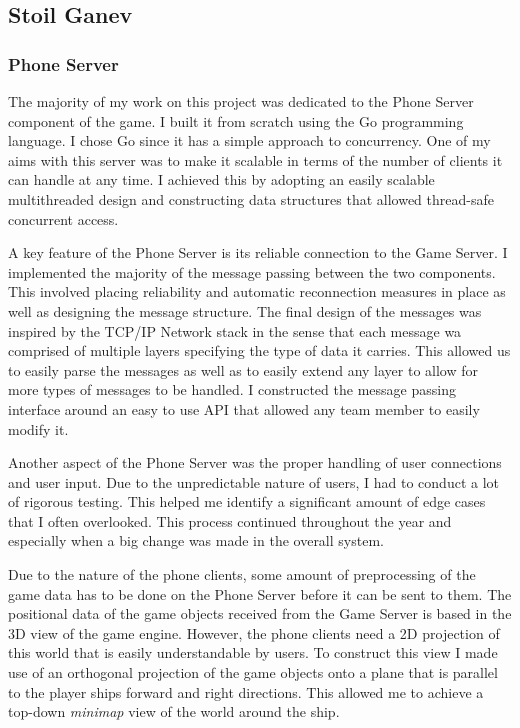 \documentclass[a4paper,11pt]{article}
\begin{document}
\clearpage

\subsection{Stoil Ganev}

\subsubsection{Phone Server}

The majority of my work on this project was dedicated to the Phone Server component of the game. I built it from scratch using the Go programming language. I chose Go since it has a simple approach to concurrency. One of my aims with this server was to make it scalable in terms of the number of clients it can handle at any time. I achieved this by adopting an easily scalable multithreaded design and constructing data structures that allowed thread-safe concurrent access.

A key feature of the Phone Server is its reliable connection to the Game Server. I implemented the majority of the message passing between the two components. This involved placing reliability and automatic reconnection measures in place as well as designing the message structure. The final design of the messages was inspired by the TCP/IP Network stack in the sense that each message wa comprised of multiple layers specifying the type of data it carries. This allowed us to easily parse the messages as well as to easily extend any layer to allow for more types of messages to be handled. I constructed the message passing interface around an easy to use API that allowed any team member to easily modify it.

Another aspect of the Phone Server was the proper handling of user connections and user input. Due to the unpredictable nature of users, I had to conduct a lot of rigorous testing. This helped me identify a significant amount of edge cases that I often overlooked. This process continued throughout the year and especially when a big change was made in the overall system.

Due to the nature of the phone clients, some amount of preprocessing of the game data has to be done on the Phone Server before it can be sent to them. The positional data of the game objects received from the Game Server is based in the 3D view of the game engine. However, the phone clients need a 2D projection of this world that is easily understandable by users. To construct this view I made use of an orthogonal projection of the game objects onto a plane that is parallel to the player ships forward and right directions. This allowed me to achieve a top-down \emph{minimap} view of the world around the ship.
\end{document}
